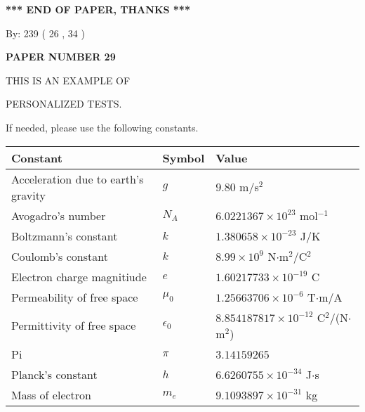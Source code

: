 \documentclass[12pt]{article}
\begin{document}
   
   
   
   
\vspace{1.0in} 
{\textbf{\large{ *** END OF PAPER, THANKS *** }}} 
   
   
\hspace{1.0in} By: 
         239 (          26 ,           34 )
   
   
   
   
\newpage 
\setcounter{page}{ 
    29001 } 
   
   
   
   
 {\textbf{ \Large{ PAPER NUMBER           29  }}}
   
   
\vspace{0.2in}
   
   
   
   
   
   
 \vspace{0.2in}
 
 
{\Huge  THIS IS AN EXAMPLE OF}
 
{\Huge  PERSONALIZED TESTS. }
 
If needed, please use the following constants.
 
 
 
\noindent\begin{tabular}{|l|l|l|}
\hline
Constant & Symbol & Value \\
\hline
Acceleration due to earth's gravity &
$g$ &
 $ 9.80 $
m/s$^2$ \\
\hline
Avogadro's number &
$N_A$ &
 $ 6.0221367 \times 10^{23} $
mol$^{-1}$ \\
\hline
Boltzmann's constant &
$k$ &
 $ 1.380658 \times 10^{-23} $
J/K \\
\hline
Coulomb's constant &
$k$ &
 $ 8.99 \times 10^{9} $
N$\cdot $m$^2$/C$^2$ \\
\hline
Electron charge magnitiude &
$e$ &
 $ 1.60217733 \times 10^{-19} $
C \\
\hline
Permeability of free space &
$\mu _0$ &
 $ 1.25663706 \times 10^{-6} $
T$\cdot $m/A \\
\hline
Permittivity of free space &
$\epsilon _0$ &
 $ 8.854187817 \times 10^{-12} $
C$^2$/(N$\cdot $m$^2$) \\
\hline
Pi &
$\pi$ &
 $ 3.14159265 $
$ $ \\
\hline
Planck's constant &
$h$ &
 $ 6.6260755 \times 10^{-34} $
J$\cdot $s \\
\hline
Mass of electron &
$m_e$ &
 $ 9.1093897 \times 10^{-31} $
kg \\
\hline
\end{tabular}
 
\end{document}
